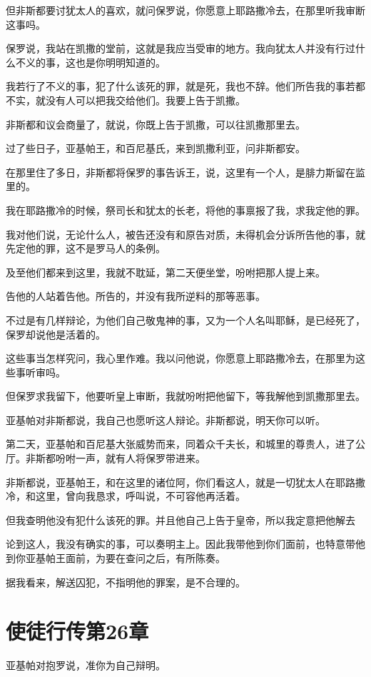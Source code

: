 \documentclass[12pt,oneside]{book}
\begin{document}
但非斯都要讨犹太人的喜欢，就问保罗说，你愿意上耶路撒冷去，在那里听我审断这事吗。

保罗说，我站在凯撒的堂前，这就是我应当受审的地方。我向犹太人并没有行过什么不义的事，这也是你明明知道的。

我若行了不义的事，犯了什么该死的罪，就是死，我也不辞。他们所告我的事若都不实，就没有人可以把我交给他们。我要上告于凯撒。

非斯都和议会商量了，就说，你既上告于凯撒，可以往凯撒那里去。

过了些日子，亚基帕王，和百尼基氏，来到凯撒利亚，问非斯都安。

在那里住了多日，非斯都将保罗的事告诉王，说，这里有一个人，是腓力斯留在监里的。

我在耶路撒冷的时候，祭司长和犹太的长老，将他的事禀报了我，求我定他的罪。

我对他们说，无论什么人，被告还没有和原告对质，未得机会分诉所告他的事，就先定他的罪，这不是罗马人的条例。

及至他们都来到这里，我就不耽延，第二天便坐堂，吩咐把那人提上来。

告他的人站着告他。所告的，并没有我所逆料的那等恶事。

不过是有几样辩论，为他们自己敬鬼神的事，又为一个人名叫耶稣，是已经死了，保罗却说他是活着的。

这些事当怎样究问，我心里作难。我以问他说，你愿意上耶路撒冷去，在那里为这些事听审吗。

但保罗求我留下，他要听皇上审断，我就吩咐把他留下，等我解他到凯撒那里去。

亚基帕对非斯都说，我自己也愿听这人辩论。非斯都说，明天你可以听。

第二天，亚基帕和百尼基大张威势而来，同着众千夫长，和城里的尊贵人，进了公厅。非斯都吩咐一声，就有人将保罗带进来。

非斯都说，亚基帕王，和在这里的诸位阿，你们看这人，就是一切犹太人在耶路撒冷，和这里，曾向我恳求，呼叫说，不可容他再活着。

但我查明他没有犯什么该死的罪。并且他自己上告于皇帝，所以我定意把他解去

论到这人，我没有确实的事，可以奏明主上。因此我带他到你们面前，也特意带他到你亚基帕王面前，为要在查问之后，有所陈奏。

据我看来，解送囚犯，不指明他的罪案，是不合理的。

\chapter{使徒行传第26章}
亚基帕对抱罗说，准你为自己辩明。
\end{document}
